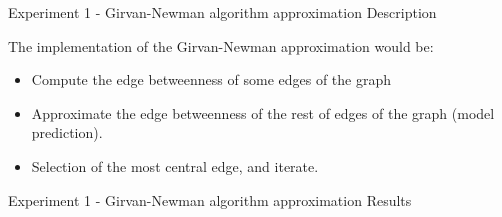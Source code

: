 \documentclass[xcolor=table]{beamer}
\begin{document}
\begin{frame}{Experiment 1 - Girvan-Newman algorithm approximation }{ Description}


The implementation of the Girvan-Newman approximation would be:
\begin{itemize}
    \item Compute the edge betweenness of some edges of the graph
    \item Approximate the edge betweenness of the rest of edges of the graph (model prediction).
    \item Selection of the most central edge, and iterate.
\end{itemize}

\end{frame}




\begin{frame}{Experiment 1 - Girvan-Newman algorithm approximation }{ Results}




\end{frame}
\end{document}
